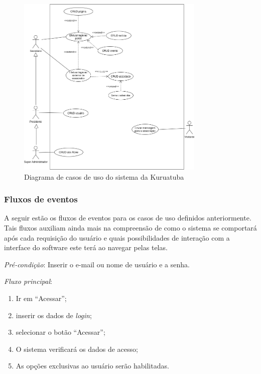\begin{figure}[htb]
 \centering
 \caption{Diagrama de casos de uso do sistema da Kuruatuba}
 \includegraphics[width=0.8\textwidth]{figuras/use-case-2.png}
 
 \label{use-case}
\end{figure}

\newpage

\hspace{2.5cm}
\subsubsection{Fluxos de eventos}
\label{subsubsec:fluxos}
\hspace{2.5cm}

A seguir estão os fluxos de eventos para os casos de uso definidos anteriormente. Tais fluxos auxiliam ainda mais na compreensão de como o sistema se comportará após cada requisição do usuário e quais possibilidades de interação com a interface do software este terá ao navegar pelas telas.

\vspace{0.7cm}

\noindent \textit{Pré-condição}: Inserir o e-mail ou nome de usuário e a senha.

\noindent \textit{Fluxo principal}:

\begin{enumerate}
    \item Ir em ``Acessar'';
    \item inserir os dados de \textit{login};
    \item selecionar o botão ``Acessar'';
    \item O sistema verificará os dados de acesso;
    \item As opções exclusivas ao usuário serão habilitadas.
\end{enumerate}

